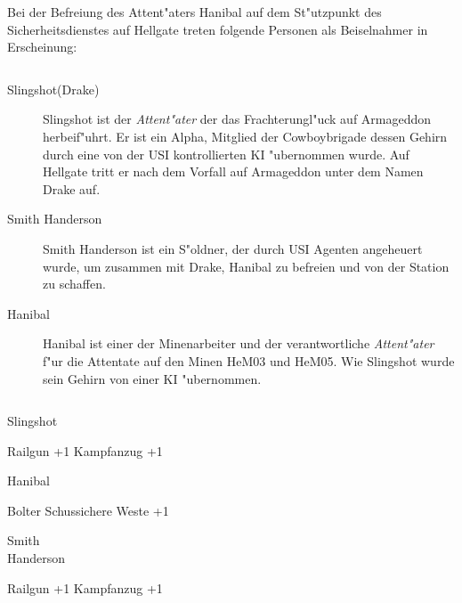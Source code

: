 
Bei der Befreiung des Attent"aters Hanibal auf dem St"utzpunkt des Sicherheitsdienstes auf Hellgate treten folgende Personen 
als Beiselnahmer in Erscheinung:

\begin{column}[l]{0.45}
    \begin{description}
        \item[Slingshot(Drake)] Slingshot ist der \emph{Attent"ater} der das Frachterungl"uck auf Armageddon herbeif"uhrt. Er ist 
            ein Alpha, Mitglied der Cowboybrigade dessen Gehirn durch eine von der USI kontrollierten KI "ubernommen wurde. 
            Auf Hellgate tritt er nach dem Vorfall auf Armageddon unter dem Namen Drake auf.
        \item[Smith Handerson] Smith Handerson ist ein S"oldner, der durch USI Agenten angeheuert wurde, um 
            zusammen mit Drake, Hanibal zu befreien und von der Station zu schaffen.
        \item[Hanibal] Hanibal ist einer der Minenarbeiter und der verantwortliche \emph{Attent"ater} f"ur die Attentate auf den Minen 
            HeM03 und HeM05. Wie Slingshot wurde sein Gehirn von einer KI "ubernommen.
    \end{description}
\end{column}
\begin{column}[r]{0.45}
    \begin{nscsheet}[h]{Slingshot}
        \nscstats[ATT=1,AGG=2,DEX=3]
        \nscruler
        \begin{nscinventory}
            \nscitem[Waffen] Railgun +1
            \nscitem[R"ustung] Kampfanzug +1
        \end{nscinventory}
    \end{nscsheet}    

    \begin{nscsheet}[h]{Hanibal}
        \nscstats[ATT=1,AGG=2,DEX=3,COM=2,CON=2]
        \nscruler
        \begin{nscinventory}
            \nscitem[Waffen] Bolter
            \nscitem[R"ustung] Schussichere Weste +1
        \end{nscinventory}
    \end{nscsheet} 

    \begin{nscsheet}[h]{Smith\\ Handerson}
        \nscstats[ATT=3,AGG=2]
        \nscruler
        \begin{nscinventory}
            \nscitem[Waffen] Railgun +1
            \nscitem[R"ustung] Kampfanzug +1
        \end{nscinventory}
    \end{nscsheet}
\end{column}

\newpage